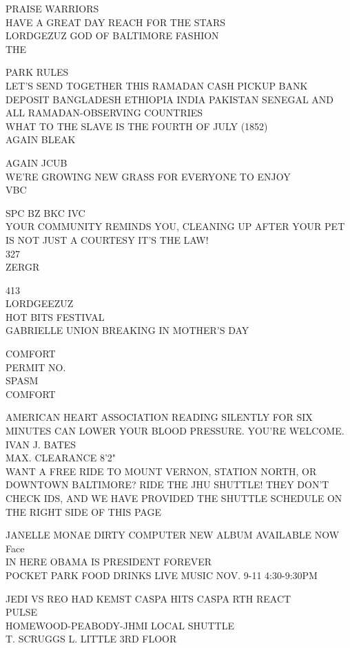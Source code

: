 \documentclass[10pt,letterpaper]{article}
\begin{document}
PRAISE WARRIORS\\
HAVE A GREAT DAY REACH FOR THE STARS\\
LORDGEZUZ GOD OF BALTIMORE FASHION\\
THE

PARK RULES\\
LET'S SEND TOGETHER THIS RAMADAN CASH PICKUP BANK DEPOSIT BANGLADESH ETHIOPIA INDIA PAKISTAN SENEGAL AND ALL RAMADAN{-}OBSERVING COUNTRIES\\
WHAT TO THE SLAVE IS THE FOURTH OF JULY (1852)\\
AGAIN BLEAK

AGAIN JCUB\\
WE'RE GROWING NEW GRASS FOR EVERYONE TO ENJOY\\
VBC

SPC BZ BKC IVC\\
YOUR COMMUNITY REMINDS YOU, CLEANING UP AFTER YOUR PET IS NOT JUST A COURTESY IT'S THE LAW!\\
327\\
ZERGR

413\\
LORDGEEZUZ\\
HOT BITS FESTIVAL\\
GABRIELLE UNION BREAKING IN MOTHER'S DAY

COMFORT\\
PERMIT NO.\\
SPASM\\
COMFORT

AMERICAN HEART ASSOCIATION READING SILENTLY FOR SIX MINUTES CAN LOWER YOUR BLOOD PRESSURE.  YOU'RE WELCOME.\\
IVAN J. BATES\\
MAX. CLEARANCE 8'2"\\
WANT A FREE RIDE TO MOUNT VERNON, STATION NORTH, OR DOWNTOWN BALTIMORE?  RIDE THE JHU SHUTTLE!  THEY DON'T CHECK IDS, AND WE HAVE PROVIDED THE SHUTTLE SCHEDULE ON THE RIGHT SIDE OF THIS PAGE

JANELLE MONAE DIRTY COMPUTER NEW ALBUM AVAILABLE NOW\\
Face\\
IN HERE OBAMA IS PRESIDENT FOREVER\\
POCKET PARK FOOD DRINKS LIVE MUSIC NOV. 9{-}11 4:30{-}9:30PM

JEDI VS REO HAD KEMST CASPA HITS CASPA RTH REACT\\
PULSE\\
HOMEWOOD{-}PEABODY{-}JHMI LOCAL SHUTTLE\\
T. SCRUGGS L. LITTLE 3RD FLOOR
\end{document}
